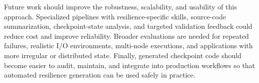 \documentclass[conference]{IEEEtran}
\begin{document}
Future work should improve the robustness, scalability, and usability of this approach. Specialized pipelines with resilience-specific skills, source-code summarization, checkpoint-state analysis, and targeted validation feedback could reduce cost and improve reliability. Broader evaluations are needed for repeated failures, realistic I/O environments, multi-node executions, and applications with more irregular or distributed state. Finally, generated checkpoint code should become easier to audit, maintain, and integrate into production workflows so that automated resilience generation can be used safely in practice.








\end{document}
